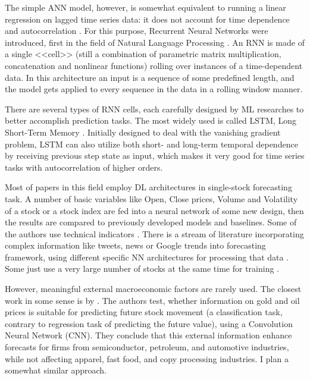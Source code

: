 \documentclass{elsarticle}
\begin{document}
The simple ANN model, however, is somewhat equivalent to running a linear regression on lagged time series data: it does not account for time dependence and autocorrelation \citep{torres_deep_2021}. For this purpose, Recurrent Neural Networks were introduced, first in the field of Natural Language Processing \citep{hewamalage_recurrent_2021}. An RNN is made of a single <<cell>> (still a combination of parametric matrix multiplication, concatenation and nonlinear functions) rolling over instances of a time-dependent data. In this architecture an input is a sequence of some predefined length, and the model gets applied to every sequence in the data in a rolling window manner.

There are several types of RNN cells, each carefully designed by ML researches to better accomplish prediction tasks. The most widely used is called LSTM, Long Short-Term Memory \citep{greff_lstm_2017}.
Initially designed to deal with the vanishing gradient problem, LSTM can also utilize both short- and long-term temporal dependence by receiving previous step state as input, which makes it very good for time series tasks with autocorrelation of higher orders.

Most of papers in this field employ DL architectures in single-stock forecasting task. A number of basic variables like Open, Close prices, Volume and Volatility of a stock or a stock index are fed into a neural network of some new design, then the results are compared to previously developed models and baselines. %
Some of the authors use technical indicators \citep[e.g.][]{nelson_stock_2017, chen_lstm-based_2015}. %
There is a stream of literature incorporating complex information like tweets, news or Google trends into forecasting framework, using different specific NN architectures for processing that data \citep{huang_using_2020, kordonis_stock_2016, hu_predicting_2018}. Some just use a very large number of stocks at the same time for training \citep{li_stock_2018}.

However, meaningful external macroeconomic factors are rarely used.
The closest work in some sense is by \citet{chen_constructing_2021}. The authors test, whether information on gold and oil prices is suitable for predicting future stock movement (a classification task, contrary to regression task of predicting the future value), using a Convolution Neural Network (CNN). They conclude that this external information enhance forecasts for firms from semiconductor, petroleum, and automotive industries, while not affecting apparel, fast food, and copy processing industries.
I plan a somewhat similar approach.
\end{document}
